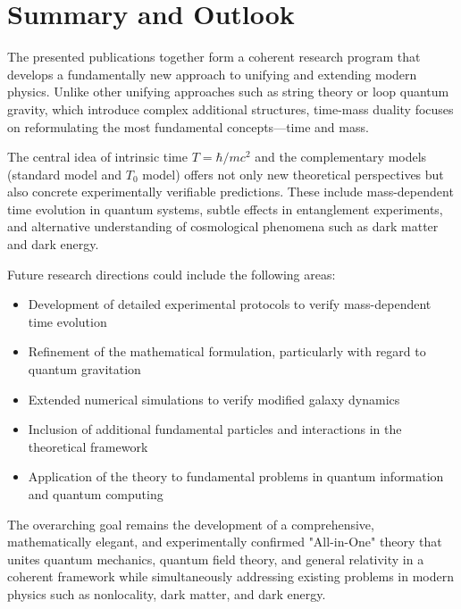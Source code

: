 \documentclass[a4paper,12pt]{article}
\begin{document}
	\section{Summary and Outlook}
	
	The presented publications together form a coherent research program that develops a fundamentally new approach to unifying and extending modern physics. Unlike other unifying approaches such as string theory or loop quantum gravity, which introduce complex additional structures, time-mass duality focuses on reformulating the most fundamental concepts—time and mass.
	
	The central idea of intrinsic time $T = \hbar/mc^2$ and the complementary models (standard model and $T_0$ model) offers not only new theoretical perspectives but also concrete experimentally verifiable predictions. These include mass-dependent time evolution in quantum systems, subtle effects in entanglement experiments, and alternative understanding of cosmological phenomena such as dark matter and dark energy.
	
	Future research directions could include the following areas:
	\begin{itemize}
		\item Development of detailed experimental protocols to verify mass-dependent time evolution
		\item Refinement of the mathematical formulation, particularly with regard to quantum gravitation
		\item Extended numerical simulations to verify modified galaxy dynamics
		\item Inclusion of additional fundamental particles and interactions in the theoretical framework
		\item Application of the theory to fundamental problems in quantum information and quantum computing
	\end{itemize}
	
	The overarching goal remains the development of a comprehensive, mathematically elegant, and experimentally confirmed "All-in-One" theory that unites quantum mechanics, quantum field theory, and general relativity in a coherent framework while simultaneously addressing existing problems in modern physics such as nonlocality, dark matter, and dark energy.
	
\end{document}
